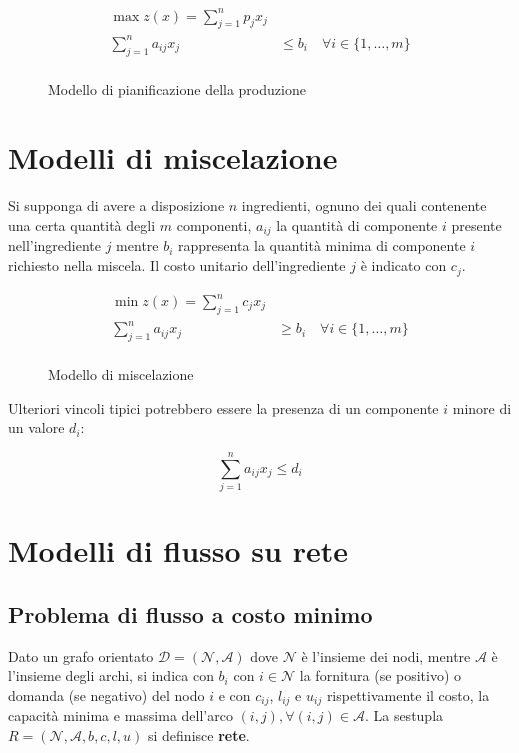 \documentclass[\main/main.tex]{subfiles}
\begin{document}
\begin{figure}
	\begin{align*}
		\max z(x) = \sum_{j=1}^n p_jx_j                                      \\
		\sum_{j=1}^n a_{ij}x_j & \leq b_i \quad \forall i \in \{1,\ldots,m\} \\
	\end{align*}
	\caption{Modello di pianificazione della produzione}
\end{figure}

\section{Modelli di miscelazione}
Si supponga di avere a disposizione $n$ ingredienti, ognuno dei quali contenente una certa quantità degli $m$ componenti, $a_{ij}$ la quantità di componente $i$ presente nell'ingrediente $j$ mentre $b_i$ rappresenta la quantità minima di componente $i$ richiesto nella miscela. Il costo unitario dell'ingrediente $j$ è indicato con $c_j$.

\begin{figure}
	\begin{align*}
		\min z(x) = \sum_{j=1}^n c_jx_j                                      \\
		\sum_{j=1}^n a_{ij}x_j & \geq b_i \quad \forall i \in \{1,\ldots,m\} \\
	\end{align*}
	\caption{Modello di miscelazione}
\end{figure}

Ulteriori vincoli tipici potrebbero essere la presenza di un componente $i$ minore di un valore $d_i$:

\[
	\sum_{j=1}^n a_{ij} x_j \leq d_i
\]

\section{Modelli di flusso su rete}

\subsection{Problema di flusso a costo minimo}  \label{min_cost_flux_sect}
Dato un grafo orientato $\mathcal{D} = (\mathcal{N}, \mathcal{A})$ dove $\mathcal{N}$ è l'insieme dei nodi, mentre $\mathcal{A}$ è l'insieme degli archi, si indica con $b_i$ con $i \in \mathcal{N}$ la fornitura (se positivo) o domanda (se negativo) del nodo $i$ e con $c_{ij}$, $l_{ij}$ e $u_{ij}$ rispettivamente il costo, la capacità minima e massima dell'arco $(i,j), \forall (i,j) \in \mathcal{A}$. La sestupla $R = (\mathcal{N}, \mathcal{A}, b, c, l, u)$ si definisce \textbf{rete}.
\end{document}
